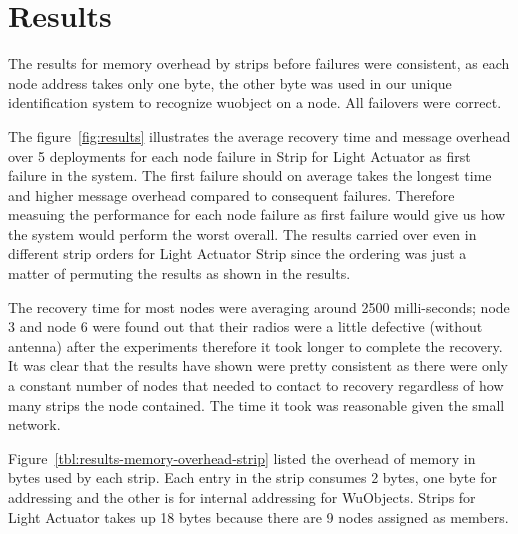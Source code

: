 




\section{Results}
\label{s:results}

The results for memory overhead by strips before failures were consistent, as
each node address takes only one byte, the other byte was used in our unique
identification system to recognize wuobject on a node. All failovers were
correct.

The figure~\ref{fig:results}
illustrates the average recovery time and message overhead over 5 deployments
for each node failure in Strip for Light Actuator as first failure in the
system. The first failure should on average takes the longest time and higher
message overhead compared to consequent failures. Therefore measuing the
performance for each node failure as first failure would give us how the system
would perform the worst overall. The results carried over even in different
strip orders for Light Actuator Strip since the ordering was just a matter of
permuting the results as shown in the results.

The recovery time for most nodes were averaging around 2500 milli-seconds; node
3 and node 6 were found out that their radios were a little defective (without
antenna) after the experiments therefore it took longer to complete the
recovery. It was clear that the results have shown were pretty consistent as
there were only a constant number of nodes that needed to contact to recovery
regardless of how many strips the node contained. The time it took was reasonable
given the small network.

Figure~\ref{tbl:results-memory-overhead-strip} listed the overhead of memory in
bytes used by each strip. Each entry in the strip consumes 2 bytes, one byte for
addressing and the other is for internal addressing for WuObjects. Strips for Light Actuator takes up 18 bytes because there are 9 nodes assigned as members.


